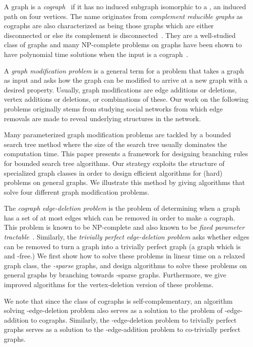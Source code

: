 \documentclass{llncs}
\begin{document}
A graph is a \emph{cograph}~\cite{Sein} if it has no induced subgraph isomorphic to a , an induced path on four vertices. The name originates from \emph{complement reducible graphs} as cographs are also characterized as being those graphs  which are either disconnected or else its complement  is disconnected~\cite{Sein}. They are a well-studied class of graphs and many NP-complete problems on graphs have been shown to have polynomial time solutions when the input is a cograph~\cite{CPS}.

A \emph{graph modification problem} is a general term for a problem that takes a graph as input and asks how the graph can be modified to arrive at a new graph with a desired property. Usually, graph modifications are edge additions or deletions, vertex additions or deletions, or combinations of these. Our work on the following problems originally stems from studying social networks from which edge removals are made to reveal underlying structures in the network.

Many parameterized graph modification problems are tackled by a bounded search tree method where the size of the search tree usually dominates the computation time. This paper presents a framework for designing branching rules for bounded search tree algorithms. Our strategy exploits the structure of specialized graph classes in order to design efficient algorithms for (hard) problems on general graphs. We illustrate this method by giving algorithms that solve four different graph modification problems.

The \emph{cograph edge-deletion problem} is the problem of determining when a graph  has a set  of at most  edges which can be removed in order to make  a cograph. This problem is known to be NP-complete \cite{ElMC} and also known to be \emph{fixed parameter tractable}~\cite{CAI}. Similarly, the \emph{trivially perfect edge-deletion problem} asks whether  edges can be removed to turn a graph into a trivially perfect graph (a graph which is  and -free.) We first show how to solve these problems in linear time on a relaxed graph class, the \emph{-sparse} graphs, and design algorithms to solve these problems on general graphs by branching towards -sparse graphs. Furthermore, we give improved algorithms for the vertex-deletion version of these problems.

We note that since the class of cographs is self-complementary, an algorithm solving -edge-deletion problem also serves as a solution to the problem of -edge-addition to cographs. Similarly, the -edge-deletion problem to trivially perfect graphs serves as a solution to the -edge-addition problem to co-trivially perfect graphs.
\end{document}
